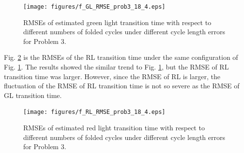 \documentclass[final,oneside,onecolumn,12pt,a4paper]{book}%
\begin{document}
\begin{figure}[th]
\centerline{\texttt{[image: figures/f\_GL\_RMSE\_prob3\_18\_4.eps]}} \hfill\caption{RMSEs of estimated green
light transition time with respect to different numbers of folded cycles under
different cycle length errors for Problem 3.}%
\label{fig:f_GL_RMSE_prob3_18_4}%
\end{figure}Fig. \ref{fig:f_RL_RMSE_prob3_18_4} is the RMSEs of the RL
transition time under the same configuration of Fig.
\ref{fig:f_GL_RMSE_prob3_18_4}. The results showed the similar trend to Fig.
\ref{fig:f_GL_RMSE_prob3_18_4}, but the RMSE of RL transition time was larger.
However, since the RMSE of RL is larger, the fluctuation of the RMSE of RL
transition time is not so severe as the RMSE of GL transition
time.\begin{figure}[th]
\centerline{\texttt{[image: figures/f\_RL\_RMSE\_prob3\_18\_4.eps]}} \hfill\caption{RMSEs of estimated red
light transition time with respect to different numbers of folded cycles under
different cycle length errors for Problem 3.}%
\label{fig:f_RL_RMSE_prob3_18_4}%
\end{figure}
\end{document}
